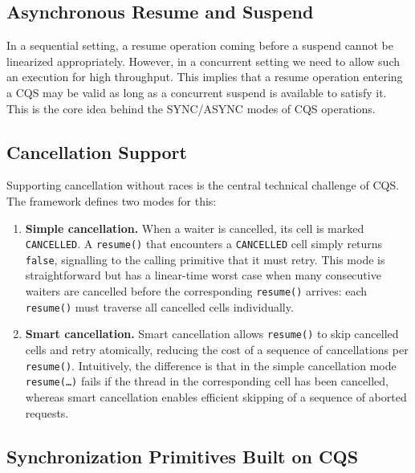 \documentclass[11pt,a4paper]{article}
\begin{document}
\subsection{Asynchronous Resume and Suspend}
\label{sec:bg-async}

In a sequential setting, a resume operation coming before a suspend
cannot be linearized appropriately. However, in a concurrent setting we
need to allow such an execution for high throughput. This implies that a
resume operation entering a CQS may be valid as long as a concurrent
suspend is available to satisfy it. This is the core idea behind the
SYNC/ASYNC modes of CQS operations.

\subsection{Cancellation Support}
\label{sec:bg-cancel}

Supporting cancellation without races is the central technical challenge
of CQS. The framework defines two modes for this:

\begin{enumerate}[leftmargin=1.5em]
  \item \textbf{Simple cancellation.} When a waiter is cancelled, its
        cell is marked \texttt{CANCELLED}. A \texttt{resume()} that
        encounters a \texttt{CANCELLED} cell simply returns
        \texttt{false}, signalling to the calling primitive that it must
        retry. This mode is straightforward but has a linear-time worst
        case when many consecutive waiters are cancelled before the
        corresponding \texttt{resume()} arrives: each \texttt{resume()}
        must traverse all cancelled cells individually.

  \item \textbf{Smart cancellation.} Smart cancellation allows
        \texttt{resume()} to skip cancelled cells and retry atomically,
        reducing the cost of a sequence of cancellations per
        \texttt{resume()}. Intuitively, the difference is that in the
        simple cancellation mode \texttt{resume(\ldots)} fails if the
        thread in the corresponding cell has been cancelled, whereas
        smart cancellation enables efficient skipping of a sequence of
        aborted requests.
\end{enumerate}

\subsection{Synchronization Primitives Built on CQS}
\label{sec:bg-primitives}
\end{document}
